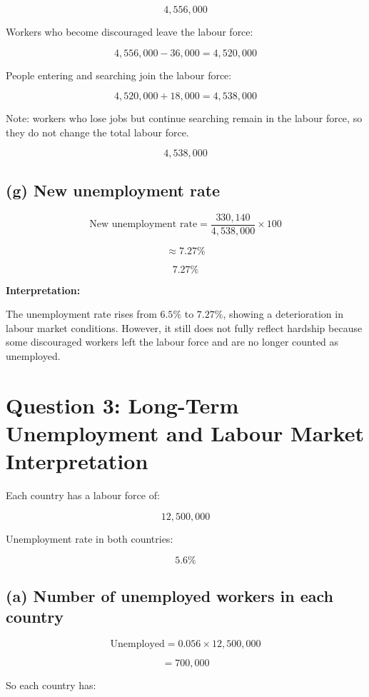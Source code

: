 \documentclass[12pt]{article}
\begin{document}
\[
4{,}556{,}000
\]

Workers who become discouraged leave the labour force:

\[
4{,}556{,}000 - 36{,}000 = 4{,}520{,}000
\]

People entering and searching join the labour force:

\[
4{,}520{,}000 + 18{,}000 = 4{,}538{,}000
\]

Note: workers who lose jobs but continue searching remain in the labour force, so they do not change the total labour force.

\[
\boxed{4{,}538{,}000}
\]

\subsection*{(g) New unemployment rate}

\[
\text{New unemployment rate}=\frac{330{,}140}{4{,}538{,}000}\times 100
\]

\[
\approx 7.27\%
\]

\[
\boxed{7.27\%}
\]

\textbf{Interpretation:}

The unemployment rate rises from \(6.5\%\) to \(7.27\%\), showing a deterioration in labour market conditions. However, it still does not fully reflect hardship because some discouraged workers left the labour force and are no longer counted as unemployed.

\vspace{1em}

\section*{Question 3: Long-Term Unemployment and Labour Market Interpretation}

Each country has a labour force of:

\[
12{,}500{,}000
\]

Unemployment rate in both countries:

\[
5.6\%
\]

\subsection*{(a) Number of unemployed workers in each country}

\[
\text{Unemployed} = 0.056 \times 12{,}500{,}000
\]

\[
= 700{,}000
\]

So each country has:
\end{document}
